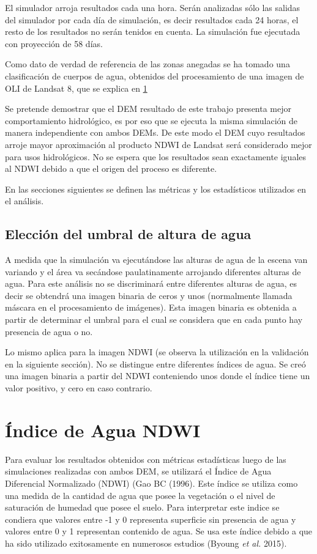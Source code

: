 \documentclass[10pt,a4paper, twoside]{report}
\begin{document}
El simulador arroja resultados cada una hora. Serán analizadas sólo las salidas del simulador por cada día de simulación, es decir resultados cada 24 horas, el resto de los resultados no serán tenidos en cuenta. La simulación fue ejecutada con proyección de 58 días.

Como dato de verdad de referencia de las zonas anegadas se ha tomado una clasificación de cuerpos de agua, obtenidos del procesamiento de una imagen de OLI de Landsat 8, que se explica en \ref{indiceaguandwi}

Se pretende demostrar que el DEM resultado de este trabajo presenta mejor comportamiento hidrológico, es por eso que se ejecuta la misma simulación de manera independiente con ambos DEMs. De este modo el DEM cuyo resultados arroje mayor aproximación al producto NDWI de Landsat será considerado mejor para usos hidrológicos. No se espera que los resultados sean exactamente iguales al NDWI debido a que el origen del proceso es diferente.

En las secciones siguientes se definen las métricas y los estadísticos utilizados en el análisis.

\subsection{Elección del umbral de altura de agua}

A medida que la simulación va ejecutándose las alturas de agua de la escena van variando y el área va secándose paulatinamente arrojando diferentes alturas de agua. Para este análisis no se discriminará entre diferentes alturas de agua, es decir se obtendrá una imagen binaria de ceros y unos (normalmente llamada máscara en el procesamiento de imágenes). Esta imagen binaria es obtenida a partir de determinar el umbral para el cual se considera que en cada punto hay presencia de agua o no.

Lo mismo aplica para la imagen NDWI (se observa la utilización en la validación en la siguiente sección). No se distingue entre diferentes índices de agua. Se creó una imagen binaria a partir del NDWI conteniendo unos donde el índice tiene un valor positivo, y cero en caso contrario.

\section{Índice de Agua NDWI}
\label{indiceaguandwi}

Para evaluar los resultados obtenidos con métricas estadísticas luego de las simulaciones realizadas con ambos DEM, se utilizará el Índice de Agua Diferencial Normalizado (NDWI) (Gao BC (1996). Este índice se utiliza como una medida de la cantidad de agua que posee la vegetación o el nivel de saturación de humedad que posee el suelo. Para interpretar este indice se condiera que valores entre -1 y 0 representa superficie sin presencia de agua y valores entre 0 y 1 representan contenido de agua. Se usa este índice debido a que ha sido utilizado exitosamente en numerosos estudios (Byoung \textit{et al.} 2015).
\end{document}
